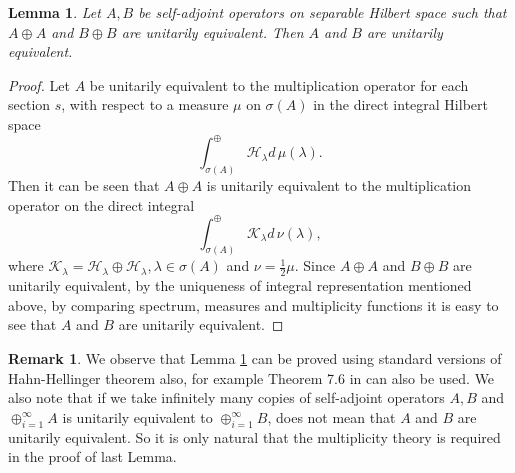 \documentclass[12pt,a4paper,twoside]{article}
\numberwithin{equation}{section}
\theoremstyle{definition}  %
\newtheorem{rmk}[defn]{Remark}
\theoremstyle{plain}  %
\newtheorem{thm}[defn]{Theorem}
\newtheorem{lem}[defn]{Lemma}
\theoremstyle{remark} %
\begin{document}
\begin{lem}\label{lem:direct-sum-unitary}
Let $A, B$ be self-adjoint operators on separable Hilbert space such that $A \oplus A$ and $B \oplus B$ are unitarily equivalent. Then $A$ and $B$ are unitarily equivalent.
\end{lem}
\begin{proof}
Let $A$ be unitarily equivalent to the multiplication operator 
for each section $s$, with respect to a measure $\mu$ on $\sigma (A)$ in the direct integral Hilbert space 
\[\int_{\sigma(A)}^{\oplus}\mathcal{H}_{\lambda}d\,\mu(\lambda).\] Then it can be seen that $A \oplus A$ is unitarily equivalent to the multiplication operator on the direct integral 
\[\int_{\sigma(A)}^{\oplus}\mathcal{K}_{\lambda}d\,\nu(\lambda) , \]  where 
$\mathcal{K}_{\lambda} = \mathcal{H}_{\lambda} \oplus \mathcal{H}_{\lambda}, \lambda \in \sigma(A)$ and $\nu = \frac{1}{2}\mu$. Since $A \oplus A$ and $B \oplus B$ are unitarily equivalent, by the uniqueness of integral representation mentioned above,  by comparing spectrum, measures and multiplicity functions it is easy to see that $A$ and $B$ are unitarily equivalent.
\end{proof}

\begin{rmk}
We observe that Lemma \ref{lem:direct-sum-unitary} can be proved using standard versions of Hahn-Hellinger theorem also, for example Theorem 7.6 in \cite{Par12} can also be used. We also note that if we take infinitely many copies of self-adjoint operators $A,B$ and $\oplus _{i=1}^{\infty} A$ is unitarily equivalent to 
$\oplus _{i=1}^{\infty} B$, does not mean that $A$ and $B$ are unitarily equivalent. So it is only natural that the multiplicity theory is required in the proof of last Lemma. 
\end{rmk}
\end{document}
